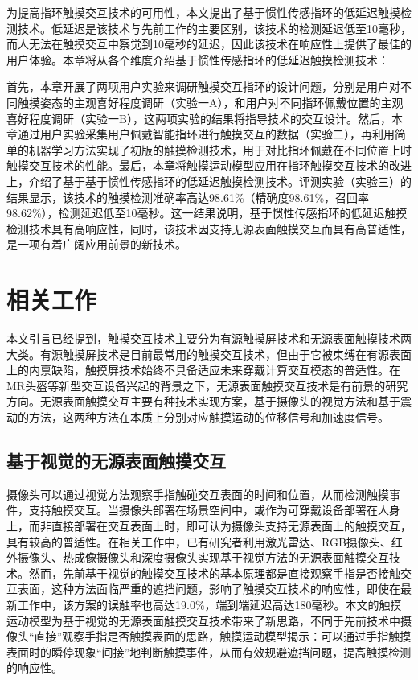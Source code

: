 为提高指环触摸交互技术的可用性，本文提出了基于惯性传感指环的低延迟触摸检测技术。低延迟是该技术与先前工作的主要区别，该技术的检测延迟低至10毫秒，而人无法在触摸交互中察觉到10毫秒的延迟，因此该技术在响应性上提供了最佳的用户体验。本章将从各个维度介绍基于惯性传感指环的低延迟触摸检测技术：

首先，本章开展了两项用户实验来调研触摸交互指环的设计问题，分别是用户对不同触摸姿态的主观喜好程度调研（实验一A），和用户对不同指环佩戴位置的主观喜好程度调研（实验一B），这两项实验的结果将指导技术的交互设计。然后，本章通过用户实验采集用户佩戴智能指环进行触摸交互的数据（实验二），再利用简单的机器学习方法实现了初版的触摸检测技术，用于对比指环佩戴在不同位置上时触摸交互技术的性能。最后，本章将触摸运动模型应用在指环触摸交互技术的改进上，介绍了基于基于惯性传感指环的低延迟触摸检测技术。评测实验（实验三）的结果显示，该技术的触摸检测准确率高达98.61\%（精确度98.61\%，召回率98.62\%），检测延迟低至10毫秒。这一结果说明，基于惯性传感指环的低延迟触摸检测技术具有高响应性，同时，该技术因支持无源表面触摸交互而具有高普适性，是一项有着广阔应用前景的新技术。

\section{相关工作}

本文引言已经提到，触摸交互技术主要分为有源触摸屏技术和无源表面触摸技术两大类。有源触摸屏技术是目前最常用的触摸交互技术\cite{lee1985multi, wang2009empirical, wilson2004touchlight}，但由于它被束缚在有源表面上的内禀缺陷，触摸屏技术始终不具备适应未来穿戴计算交互模态的普适性。在MR头盔等新型交互设备兴起的背景之下，无源表面触摸交互技术是有前景的研究方向。无源表面触摸交互主要有种技术实现方案，基于摄像头的视觉方法和基于震动的方法，这两种方法在本质上分别对应触摸运动的位移信号和加速度信号。

\subsection{基于视觉的无源表面触摸交互}

摄像头可以通过视觉方法观察手指触碰交互表面的时间和位置，从而检测触摸事件，支持触摸交互。当摄像头部署在场景空间中，或作为可穿戴设备部署在人身上\cite{harrison2011omnitouch, xiao2018mrtouch}，而非直接部署在交互表面上时，即可认为摄像头支持无源表面上的触摸交互，具有较高的普适性。在相关工作中，已有研究者利用激光雷达\cite{paradiso2000sensor}、RGB摄像头\cite{agarwal2007high, chang2005real, letessier2004visual, sugita2008touch}、红外摄像头\cite{grudin2001integrating}、热成像摄像头\cite{saba2012dante}和深度摄像头\cite{agarwal2007high, xiao2016direct, xiao2018mrtouch, benko2012miragetable, harrison2011omnitouch, wilson2010combining}实现基于视觉方法的无源表面触摸交互技术。然而，先前基于视觉的触摸交互技术的基本原理都是直接观察手指是否接触交互表面，这种方法面临严重的遮挡问题，影响了触摸交互技术的响应性，即使在最新工作中\cite{xiao2018mrtouch}，该方案的误触率也高达19.0\%，端到端延迟高达180毫秒。本文的触摸运动模型为基于视觉的无源表面触摸交互技术带来了新思路，不同于先前技术中摄像头“直接”观察手指是否触摸表面的思路，触摸运动模型揭示：可以通过手指触摸表面时的瞬停现象“间接”地判断触摸事件，从而有效规避遮挡问题，提高触摸检测的响应性。

